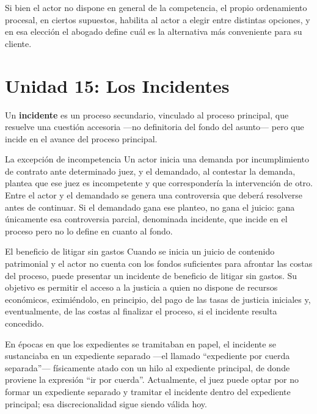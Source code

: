 \documentclass[12pt,oneside]{book}
\begin{document}
Si bien el actor no dispone en general de la competencia, el propio ordenamiento procesal, en ciertos supuestos, habilita al actor a elegir entre distintas opciones, y en esa elección el abogado define cuál es la alternativa más conveniente para su cliente.

\section{Unidad 15: Los Incidentes}

Un \textbf{incidente} es un proceso secundario, vinculado al proceso principal, que resuelve una cuestión accesoria ---no definitoria del fondo del asunto--- pero que incide en el avance del proceso principal.

\begin{example}{La excepción de incompetencia}
Un actor inicia una demanda por incumplimiento de contrato ante determinado juez, y el demandado, al contestar la demanda, plantea que ese juez es incompetente y que correspondería la intervención de otro. Entre el actor y el demandado se genera una controversia que deberá resolverse antes de continuar. Si el demandado gana ese planteo, no gana el juicio: gana únicamente esa controversia parcial, denominada incidente, que incide en el proceso pero no lo define en cuanto al fondo.
\end{example}

\begin{example}{El beneficio de litigar sin gastos}
Cuando se inicia un juicio de contenido patrimonial y el actor no cuenta con los fondos suficientes para afrontar las costas del proceso, puede presentar un incidente de beneficio de litigar sin gastos. Su objetivo es permitir el acceso a la justicia a quien no dispone de recursos económicos, eximiéndolo, en principio, del pago de las tasas de justicia iniciales y, eventualmente, de las costas al finalizar el proceso, si el incidente resulta concedido.
\end{example}

En épocas en que los expedientes se tramitaban en papel, el incidente se sustanciaba en un expediente separado ---el llamado ``expediente por cuerda separada''--- físicamente atado con un hilo al expediente principal, de donde proviene la expresión ``ir por cuerda''. Actualmente, el juez puede optar por no formar un expediente separado y tramitar el incidente dentro del expediente principal; esa discrecionalidad sigue siendo válida hoy.

\end{document}
